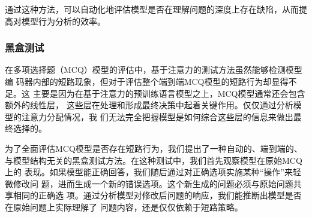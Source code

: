     通过这种方法，可以自动化地评估模型是否在理解问题的深度上存在缺陷，从而提高对模型行为分析的效率。
\subsubsection{黑盒测试}
\label{sec3:proxy}
在多项选择题（MCQ）模型的评估中，基于注意力的测试方法虽然能够检测模型编
码器内部的短路现象，但对于评估整个端到端MCQ模型的短路行为却显得不足。这
主要是因为在基于注意力的预训练语言模型之上，MCQ模型通常还会包含额外的线性层，
这些层在处理和形成最终决策中起着关键作用。仅仅通过分析模型的注意力分配情况，我
们无法完全把握模型是如何综合这些层的信息来做出最终选择的。

为了全面评估MCQ模型是否存在短路行为，我们提出了一种自动的、端到端的、
与模型结构无关的黑盒测试方法。在这种测试中，我们首先观察模型在原始MCQ上的
表现。如果模型能正确回答，我们随后通过对正确选项实施某种``操作''来轻微修改问
题，进而生成一个新的错误选项。这个新生成的问题必须与原始问题共享相同的正确选
项。通过分析模型对修改后问题的响应，我们能推断出模型是否在原始问题上实际理解了
问题内容，还是仅仅依赖于短路策略。
    
